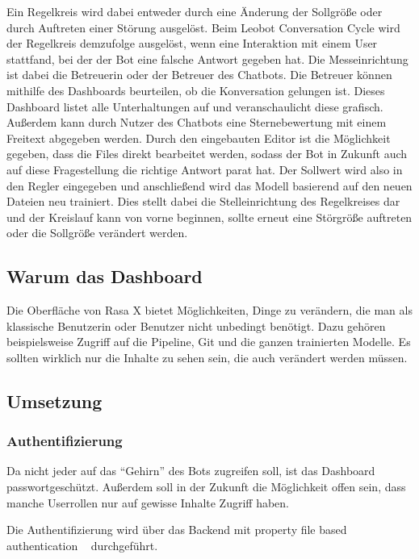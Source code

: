 Ein Regelkreis wird dabei entweder durch eine Änderung der Sollgröße oder durch Auftreten einer Störung ausgelöst.
Beim Leobot Conversation Cycle wird der Regelkreis demzufolge ausgelöst, wenn eine Interaktion mit einem User stattfand, bei der der Bot eine falsche Antwort gegeben hat.
Die Messeinrichtung ist dabei die Betreuerin oder der Betreuer des Chatbots.
Die Betreuer können mithilfe des Dashboards beurteilen, ob die Konversation gelungen ist.
Dieses Dashboard listet alle Unterhaltungen auf und veranschaulicht diese grafisch.
Außerdem kann durch Nutzer des Chatbots eine Sternebewertung mit einem Freitext abgegeben werden.
Durch den eingebauten Editor ist die Möglichkeit gegeben, dass die Files direkt bearbeitet werden, sodass der Bot in Zukunft auch auf diese Fragestellung die richtige Antwort parat hat.
Der Sollwert wird also in den Regler eingegeben und anschließend wird das Modell basierend auf den neuen Dateien neu trainiert.
Dies stellt dabei die Stelleinrichtung des Regelkreises dar und der Kreislauf kann von vorne beginnen, sollte erneut eine Störgröße auftreten oder die Sollgröße verändert werden.


\subsection{Warum das Dashboard}

Die Oberfläche von Rasa X bietet Möglichkeiten, Dinge zu verändern, die man als klassische Benutzerin oder Benutzer nicht unbedingt benötigt.
Dazu gehören beispielsweise Zugriff auf die Pipeline, Git und die ganzen trainierten Modelle.
Es sollten wirklich nur die Inhalte zu sehen sein, die auch verändert werden müssen.

\subsection{Umsetzung}

\subsubsection{Authentifizierung}
Da nicht jeder auf das ``Gehirn'' des Bots zugreifen soll, ist das Dashboard passwortgeschützt.
Außerdem soll in der Zukunft die Möglichkeit offen sein, dass manche Userrollen nur auf gewisse Inhalte Zugriff haben.

Die Authentifizierung wird über das Backend mit property file based authentication ~\cite{authentication} durchgeführt.

